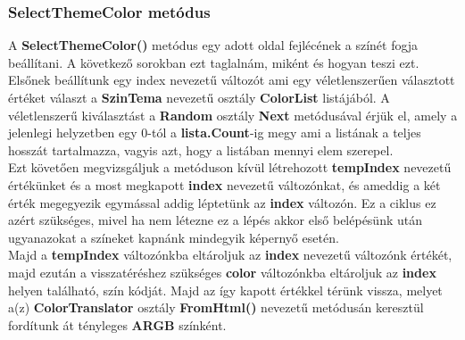 \documentclass[tocnopagenum]{thesis-ekf}
\theoremstyle{definition}
\theoremstyle{remark}
\begin{document}
	\subsubsection{SelectThemeColor metódus}
	A \textbf{SelectThemeColor()} metódus egy adott oldal fejlécének a színét fogja beállítani. A következő sorokban ezt taglalnám, miként és hogyan teszi ezt. 
	\\
	Elsőnek beállítunk egy index nevezetű változót ami egy véletlenszerűen választott értéket választ a \textbf{SzinTema} nevezetű osztály \textbf{ColorList} listájából. A véletlenszerű kiválasztást a \textbf{Random} osztály \textbf{Next} metódusával érjük el, amely a jelenlegi helyzetben egy 0-tól a \textbf{lista.Count}-ig megy ami a listának a teljes hosszát tartalmazza, vagyis azt, hogy a listában mennyi elem szerepel. 
	\\
	Ezt követően megvizsgáljuk a metóduson kívül létrehozott \textbf{tempIndex} nevezetű értékünket és a most megkapott \textbf{index} nevezetű változónkat, és ameddig a két érték megegyezik egymással addig léptetünk az \textbf{index} változón. Ez a ciklus ez azért szükséges, mivel ha nem létezne ez a lépés akkor első belépésünk után ugyanazokat a színeket kapnánk mindegyik képernyő esetén. 
	\\
	Majd a \textbf{tempIndex} változónkba eltároljuk az \textbf{index} nevezetű változónk értékét, majd ezután a visszatéréshez szükséges \textbf{color} változónkba eltároljuk az \textbf{index} helyen található, szín kódját. Majd az így kapott értékkel térünk vissza, melyet a(z) \textbf{ColorTranslator} osztály \textbf{FromHtml()} nevezetű metódusán keresztül fordítunk át tényleges \textbf{ARGB} színként.
	
	
\end{document}
